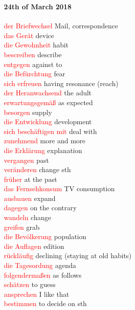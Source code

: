 \documentclass{article}
\begin{document}
\begin{multicols}{2}
	\textbf{24th of March 2018}\\\\
	\textcolor{red}{der Briefwechsel} Mail, correspondence\\
	\textcolor{red}{das Gerät} device \\
	\textcolor{red}{die Gewohnheit} habit \\
	\textcolor{red}{bescreiben} describe\\
	\textcolor{red}{entgegen} against to \\
	\textcolor{red}{die Befürchtung} fear\\
	\textcolor{red}{sich erfreuen} having resonance (reach) \\
	\textcolor{red}{der Heranwachsend} the adult \\
	\textcolor{red}{erwartungsgemäß} as expected \\
	\textcolor{red}{besorgen} supply \\
	\textcolor{red}{die Entwicklung} development \\
	\textcolor{red}{sich beschäftigen mit} deal with \\
	\textcolor{red}{zunehmend} more and more \\
	\textcolor{red}{die Erklärung} explanation \\
	\textcolor{red}{vergangen} past\\
	\textcolor{red}{veränderen} change sth \\
	\textcolor{red}{früher} at the past \\
	\textcolor{red}{das Fernsehkonsum} TV consumption\\
	\textcolor{red}{ausbauen} expand \\
	\textcolor{red}{dagegen} on the contrary\\
	\textcolor{red}{wandeln} change\\
	\textcolor{red}{greifen} grab\\
	\textcolor{red}{die Bevölkerung} population \\
	\textcolor{red}{die Auflagen} edition\\
	\textcolor{red}{rückläufig} declining (staying at old habits)\\
	\textcolor{red}{die Tagesordung} agenda \\
	\textcolor{red}{folgendermaßen} as follows \\ 
	\textcolor{red}{schätzen} to guess\\
	\textcolor{red}{ansprechen} I like that \\
	\textcolor{red}{bestimmen} to decide on sth\\ 

\end{multicols}
\end{document}
